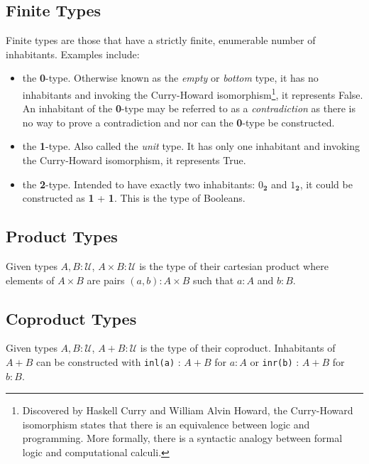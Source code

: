 \documentclass[12pt]{report}
\begin{document}
\subsection{Finite Types}
Finite types are those that have a strictly finite, enumerable number of inhabitants. Examples include:
\begin{itemize}
\item the \textbf{0}-type. Otherwise known as the \textit{empty} or \textit{bottom} type, it has no inhabitants and invoking the Curry-Howard isomorphism\footnote{

Discovered by Haskell Curry and William Alvin Howard, the Curry-Howard isomorphism states that there is an equivalence between logic and programming. More formally, there is a syntactic analogy between formal logic and computational calculi.

}, it represents False. An inhabitant of the \textbf{0}-type may be referred to as a \textit{contradiction} as there is no way to prove a contradiction and nor can the \textbf{0}-type be constructed.
\item the \textbf{1}-type. Also called the \textit{unit} type. It has only one inhabitant and invoking the Curry-Howard isomorphism, it represents True. 
\item the \textbf{2}-type. Intended to have exactly two inhabitants: $0_\textbf{2}$ and $1_\textbf{2}$, it could be constructed as \textbf{1} + \textbf{1}. This is the type of Booleans.
\end{itemize}

\subsection{Product Types}
Given types $A,B : \mathcal{U}$, $A \times B : \mathcal{U}$ is the type of their cartesian product where elements of $A \times B$ are pairs $(a,b) : A \times B$ such that $a : A$ and $b : B$. 

\subsection{Coproduct Types}
Given types $A,B : \mathcal{U}$, $A + B : \mathcal{U}$ is the type of their coproduct. Inhabitants of $A + B$ can be constructed with \texttt{inl(a)} : $A + B$ for $a : A$ or \texttt{inr(b)} : $A + B$ for $b : B$.
\end{document}
